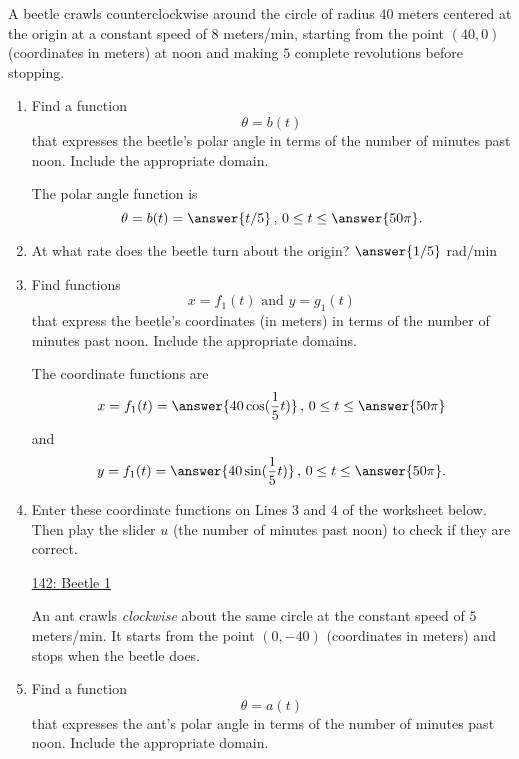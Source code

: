 \documentclass{ximera}
\begin{document}
\begin{example} \label{Edfhg]hghgdfg}
A beetle crawls counterclockwise around the circle of radius $40$ meters centered at the origin at a constant speed of $8$ meters/min, starting from the point $(40,0)$ (coordinates in meters) at noon and making $5$ complete revolutions before stopping.

\begin{enumerate}

\item Find a function
\[
    \theta = b(t)
\]
that expresses the beetle's polar angle in terms of the number of minutes past noon. Include the appropriate domain.

The polar angle function is
\[
   \theta = b(t) = \answer{t/5} \, , \, 0 \leq t \leq \answer{50\pi} .
\]

\item At what rate does the beetle turn about the origin?  $\answer{1/5}$ rad/min



\item Find functions
\[
   x = f_1(t) \text{ and } y=g_1(t)
\]
that express the beetle's coordinates (in meters)  in terms of the number of minutes past noon. Include the appropriate domains.

The coordinate functions are
\[
    x = f_1(t) = \answer{40\cos(\frac{1}{5}t)} \, , \, 0 \leq t \leq \answer{50\pi} 
\]
and 
\[
    y = f_1(t) = \answer{40\sin(\frac{1}{5}t)} \, , \, 0 \leq t \leq \answer{50\pi} .
\]

\item Enter these coordinate functions on Lines 3 and 4 of the worksheet below. Then play the slider $u$ (the number of minutes past noon) to check if they are correct.

\begin{onlineOnly}
    \begin{center}
\end{center}
\end{onlineOnly}

\href{https://www.desmos.com/calculator/pygmcbcogi}{142: Beetle 1}



An ant crawls \emph{clockwise} about the same circle at the constant speed of $5$ meters/min. It starts from the point $(0,-40)$  (coordinates in meters) and stops when the beetle does.

\item Find a function
\[
    \theta = a(t)
\]
that expresses the ant's polar angle in terms of the number of minutes past noon. Include the appropriate domain.


\end{enumerate}
\end{example}
\end{document}
